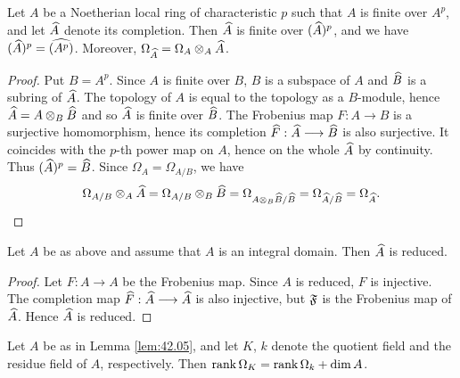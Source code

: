 \documentclass[../main]{subfiles}
\begin{document}
\begin{lemma}\label{lem:42.04}
Let $A$ be a Noetherian local ring of characteristic $p$ such that $A$ is finite over $A^p$, and let $\widehat{A}$ denote its completion. Then $\widehat{A}$ is finite over $(\widehat{A})^p$, and we have $(\widehat{A})^p=\widehat{(A^p)}$. Moreover, $\Omega_{\widehat{A}}=\Omega_A \otimes_A \widehat{A}$.
\end{lemma}

\begin{proof}
Put $B=A^p$. Since $A$ is finite over $B$, $B$ is a subspace of $A$ and $\widehat{B}$ is a subring of $\widehat{A}$. The topology of $A$ is equal to the topology as a $B$-module, hence $\widehat{A}=A \otimes_B \widehat{B}$ and so $\widehat{A}$ is finite over $\widehat{B}$. The Frobenius map $F: A\longrightarrow B$ is a surjective homomorphism, hence its completion $\widehat{F}: \widehat{A}\longrightarrow \widehat{B}$ is also surjective. It coincides with the $p$-th power map on $A$, hence on the whole $\widehat{A}$ by continuity. Thus $(\widehat{A})^p=\widehat{B}$. Since $\Omega_A=\Omega_{A / B}$, we have \[\Omega_{A / B} \otimes_A \widehat{A}=\Omega_{A / B} \otimes_B \widehat{B}=\Omega_{A \otimes_B \widehat{B}/\widehat{B}}=\Omega_{\widehat{A} / \widehat{B}}=\Omega_{\widehat{A}}.\]
\end{proof}

\begin{lemma}\label{lem:42.05}
Let $A$ be as above and assume that $A$ is an integral domain. Then $\widehat{A}$ is reduced.
\end{lemma}

\begin{proof}
Let $F: A\longrightarrow A$ be the Frobenius map. Since $A$ is reduced, $F$ is injective. The completion map $\widehat{F}: \widehat{A}\longrightarrow \widehat{A}$ is also injective, but $\mathfrak{F}$ is the Frobenius map of $\widehat{A}$. Hence $\widehat{A}$ is reduced.
\end{proof}

\begin{lemma}\label{lem:42.06}
Let $A$ be as in Lemma \ref{lem:42.05}, and let $K$, $k$ denote the quotient field and the residue field of $A$, respectively. Then $\operatorname{rank}\Omega_K=\operatorname{rank} \Omega_k+\operatorname{dim} A$.
\end{lemma}
\end{document}
